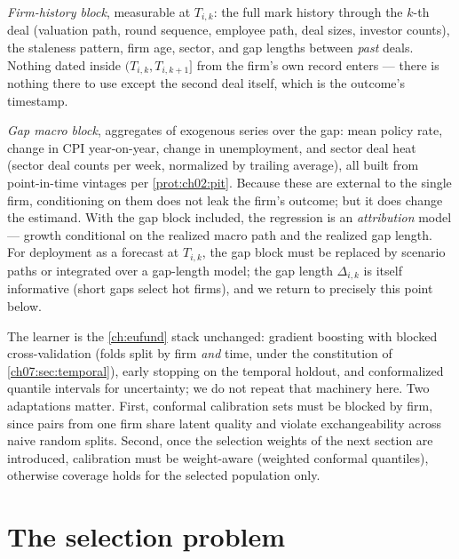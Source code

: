 \emph{Firm-history block}, measurable at $T_{i,k}$: the full mark history through the $k$-th
deal (valuation path, round sequence, employee path, deal sizes, investor counts), the staleness
pattern, firm age, sector, and gap lengths between \emph{past} deals. Nothing dated inside
$(T_{i,k}, T_{i,k+1}]$ from the firm's own record enters --- there is nothing there to use
except the second deal itself, which is the outcome's timestamp.

\emph{Gap macro block}, aggregates of exogenous series over the gap: mean policy rate, change in
CPI year-on-year, change in unemployment, and sector deal heat (sector deal counts per week,
normalized by trailing average), all built from point-in-time vintages per \cref{prot:ch02:pit}.
Because these are external to the single firm, conditioning on them does not leak the firm's
outcome; but it does change the estimand. With the gap block included, the regression is an
\emph{attribution} model --- growth conditional on the realized macro path and the realized gap
length. For deployment as a forecast at $T_{i,k}$, the gap block must be replaced by scenario
paths or integrated over a gap-length model; the gap length $\Delta_{i,k}$ is itself informative
(short gaps select hot firms), and we return to precisely this point below.

The learner is the \cref{ch:eufund} stack unchanged: gradient boosting with blocked
cross-validation (folds split by firm \emph{and} time, under the constitution of
\cref{ch07:sec:temporal}), early stopping on the temporal holdout, and conformalized quantile
intervals for uncertainty; we do not repeat that machinery here. Two adaptations matter. First,
conformal calibration sets must be blocked by firm, since pairs from one firm share latent
quality and violate exchangeability across naive random splits. Second, once the selection
weights of the next section are introduced, calibration must be weight-aware (weighted conformal
quantiles), otherwise coverage holds for the selected population only.

\section{The selection problem}\label{chpx:sec:selection}

